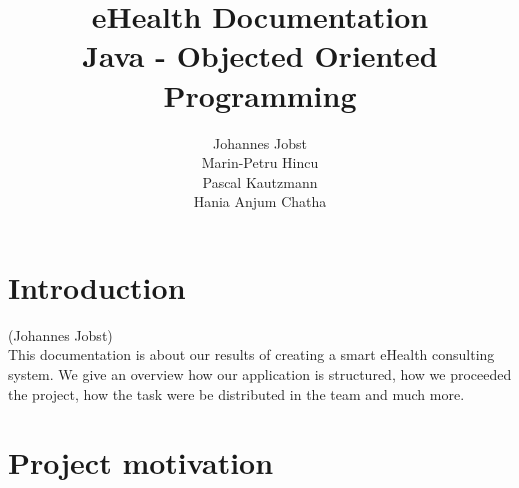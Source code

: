 \documentclass[a4paper, 12pt]{report}
\title{\textbf{eHealth Documentation}\\Java - Objected Oriented Programming}
\author{Johannes Jobst\\Marin-Petru Hincu\\Pascal Kautzmann\\Hania Anjum Chatha}
\begin{document}
\maketitle


\tableofcontents
\listoffigures

\chapter{Introduction}
{\tiny (Johannes Jobst)\\}
This documentation is about our results of creating a smart eHealth consulting system. We give an overview how our application is structured, how we proceeded the project, how the task were be distributed in the team and much more.

\chapter{Project motivation}
\end{document}
